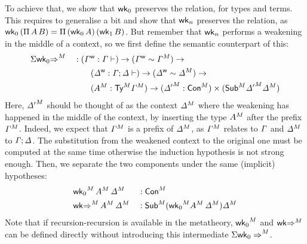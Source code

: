   To achieve that, we show that $\mathsf{wk}_0$ preserves the relation, for types and terms.
  This requires to generalise a bit and show that $\mathsf{wk}_n$ preserves the relation,
  as $\mathsf{wk}_0\,(\Pi\,A\,B)=\Pi\,(\mathsf{wk}_0\,A)\,(\mathsf{wk}_1\,B)$.
  But remember that $\mathsf{wk}_n$ performs a weakening in the middle of a context, so
  we first define the semantic counterpart of this:
\begin{alignat*}{5}
  & {\Sigma\mathsf{wk}_0{\Rightarrow}}^M  && :
  ({\mathit{\Gamma}}^{\mathsf{w}} : \mathit{\Gamma} \vdash) \rightarrow
  ({\mathit{\Gamma}}^{\mathsf{w}} \sim {\mathit{\Gamma}}^M) \rightarrow
  \\
  & && \qquad
  ({\mathit{\Delta}}^{\mathsf{w}} : \mathit{\Gamma};\mathit{\Delta} \vdash) \rightarrow
  ({\mathit{\Delta}}^{\mathsf{w}} \sim {\mathit{\Delta}}^M) \rightarrow
  \\ &&& \qquad
  ({A}^M : {\mathsf{Ty}}^M{\mathit{\Gamma}}^M)\rightarrow
  ({\mathit{\Delta}'}^M : {\mathsf{Con}}^M) \times ({\mathsf{Sub}}^M{\mathit{\Delta}'}^M{{\mathit{\Delta}}^M})
\end{alignat*}
Here, ${\mathit{\Delta}'}^M$ should be thought of as the context ${\mathit{\Delta}}^M$ where
the weakening has happened in the middle of the context, by inserting the type
${A}^M$ after the prefix ${\mathit{\Gamma}}^M$. Indeed, we expect that
${\mathit{\Gamma}}^M$ is a prefix of ${\mathit{\Delta}}^M$, as ${\mathit{\Gamma}}^M$ relates to
$\mathit{\Gamma}$ and ${\mathit{\Delta}}^M$ to $\mathit{\Gamma};\mathit{\Delta}$.
The substitution from the weakened context to the original one must
be computed at the same time otherwise the induction hypothesis is not strong enough.
Then, we separate the two components under the same (implicit) hypotheses:
\begin{alignat*}{5}
  & {\mathsf{wk}_0}^M\,{A}^M\,{\mathit{\Delta}}^M  && :
   {\mathsf{Con}}^M
   \\
  & {\mathsf{wk}{\Rightarrow}}^M\,{A}^M\,{\mathit{\Delta}}^M  && :
   {\mathsf{Sub}}^M({\mathsf{wk}_0}^M{A}^M\,{\mathit{\Delta}}^M){\mathit{\Delta}}^M
\end{alignat*}
Note that if recursion-recursion is available in the metatheory, ${\mathsf{wk}_0}^M$
and $\mathsf{wk}{\Rightarrow}^M$ can be defined directly without introducing this
intermediate ${\Sigma\mathsf{wk}_0\Rightarrow}^M$.

